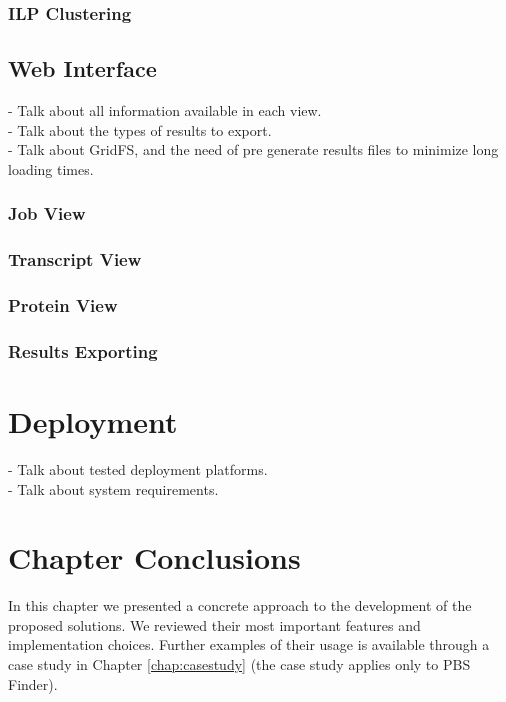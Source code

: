 \subsubsection*{ILP Clustering}

\subsection{Web Interface}

\begin{Notes}
- Talk about all information available in each view.\\
- Talk about the types of results to export.\\
- Talk about GridFS, and the need of pre generate results files to minimize long
loading times.\\
\end{Notes}

\subsubsection*{Job View}

\subsubsection*{Transcript View}

\subsubsection*{Protein View}

\subsubsection*{Results Exporting}

\section{Deployment}

\begin{Notes}
- Talk about tested deployment platforms.\\
- Talk about system requirements.\\
\end{Notes}

\section{Chapter Conclusions}


In this chapter we presented a concrete approach to the development of the
proposed solutions. We reviewed their most important features and implementation
choices. Further examples of their usage is available through a case study in
Chapter \ref{chap:casestudy} (the case study applies only to PBS Finder).
